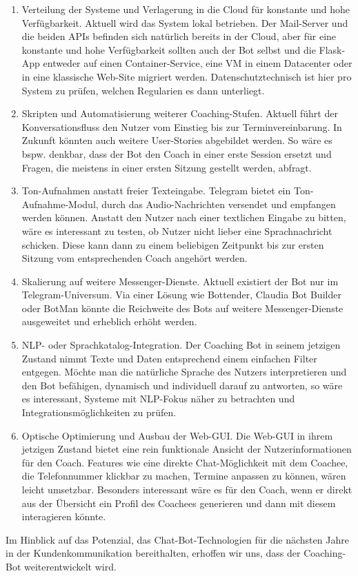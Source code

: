     \begin{enumerate}
        \item Verteilung der Systeme und Verlagerung in die Cloud für konstante und hohe Verfügbarkeit. Aktuell wird das System lokal betrieben. Der Mail-Server und die beiden APIs befinden sich natürlich bereits in der Cloud, aber für eine konstante und hohe Verfügbarkeit sollten auch der Bot selbst und die Flask-App entweder auf einen Container-Service, eine VM in einem Datacenter oder in eine klassische Web-Site migriert werden. Datenschutztechnisch ist hier pro System zu prüfen, welchen Regularien es dann unterliegt. 
        \item Skripten und Automatisierung weiterer Coaching-Stufen. Aktuell führt der Konversationsfluss den Nutzer vom Einstieg bis zur Terminvereinbarung. In Zukunft könnten auch weitere User-Stories abgebildet werden. So wäre es bspw. denkbar, dass der Bot den Coach in einer erste Session ersetzt und Fragen, die meistens in einer ersten Sitzung gestellt werden, abfragt.
        \item Ton-Aufnahmen anstatt freier Texteingabe. Telegram bietet ein Ton-Aufnahme-Modul, durch das Audio-Nachrichten versendet und empfangen werden können. Anstatt den Nutzer nach einer textlichen Eingabe zu bitten, wäre es interessant zu testen, ob Nutzer nicht lieber eine Sprachnachricht schicken. Diese kann dann zu einem beliebigen Zeitpunkt bis zur ersten Sitzung vom entsprechenden Coach angehört werden.
        \item Skalierung auf weitere Messenger-Dienste. Aktuell existiert der Bot nur im Telegram-Universum. Via einer Lösung wie Bottender, Claudia Bot Builder oder BotMan könnte die Reichweite des Bots auf weitere Messenger-Dienste ausgeweitet und erheblich erhöht werden.
        \item NLP- oder Sprachkatalog-Integration. Der Coaching Bot in seinem jetzigen Zustand nimmt Texte und Daten entsprechend einem einfachen Filter entgegen. Möchte man die natürliche Sprache des Nutzers interpretieren und den Bot befähigen, dynamisch und individuell darauf zu antworten, so wäre es interessant, Systeme mit NLP-Fokus näher zu betrachten und Integrationsmöglichkeiten zu prüfen. 
        \item Optische Optimierung und Ausbau der Web-GUI. Die Web-GUI in ihrem jetzigen Zustand bietet eine rein funktionale Ansicht der Nutzerinformationen für den Coach. Features wie eine direkte Chat-Möglichkeit mit dem Coachee, die Telefonnummer klickbar zu machen, Termine anpassen zu können, wären leicht umsetzbar. Besonders interessant wäre es für den Coach, wenn er direkt aus der Übersicht ein Profil des Coachees generieren und dann mit diesem interagieren könnte.
        
    \end{enumerate}

    Im Hinblick auf das Potenzial, das Chat-Bot-Technologien für die nächsten Jahre in der Kundenkommunikation bereithalten, erhoffen wir uns, dass der Coaching-Bot weiterentwickelt wird.